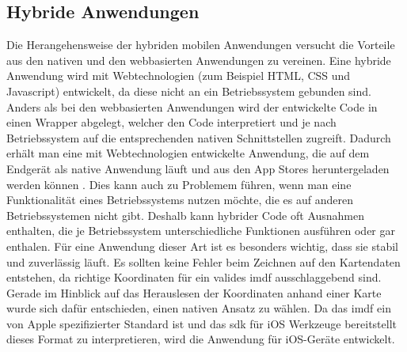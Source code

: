 \subsection{Hybride Anwendungen}
Die Herangehensweise der hybriden mobilen Anwendungen versucht die Vorteile aus den nativen und den webbasierten Anwendungen zu vereinen. Eine hybride Anwendung wird mit Webtechnologien (zum Beispiel HTML, CSS und Javascript) entwickelt, da diese nicht an ein Betriebssystem gebunden sind. Anders als bei den webbasierten Anwendungen wird der entwickelte Code in einen Wrapper abgelegt, welcher den Code interpretiert und je nach Betriebssystem auf die entsprechenden nativen Schnittstellen zugreift. Dadurch erhält man eine mit Webtechnologien entwickelte Anwendung, die auf dem Endgerät als native Anwendung läuft und aus den App Stores heruntergeladen werden können \parencite{HUY2017}. Dies kann auch zu Problemem führen, wenn man eine Funktionalität eines Betriebssystems nutzen möchte, die es auf anderen Betriebssystemen nicht gibt. Deshalb kann hybrider Code oft Ausnahmen enthalten, die je Betriebssystem unterschiedliche Funktionen ausführen oder gar enthalen.\pbreak%
%
Für eine Anwendung dieser Art ist es besonders wichtig, dass sie stabil und zuverlässig läuft.
Es sollten keine Fehler beim Zeichnen auf den Kartendaten entstehen, da richtige Koordinaten für ein valides \acl{imdf} ausschlaggebend sind.
Gerade im Hinblick auf das Herauslesen der Koordinaten anhand einer Karte wurde sich dafür entschieden, einen nativen Ansatz zu wählen.
Da das \acl{imdf} ein von Apple spezifizierter Standard ist und das \Gls{sdk} für iOS Werkzeuge bereitstellt dieses Format zu interpretieren, wird die Anwendung für iOS-Geräte entwickelt.
